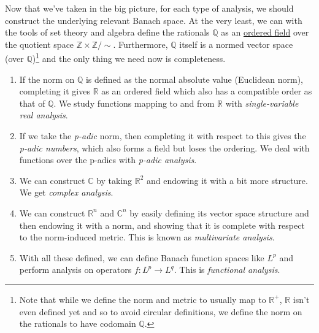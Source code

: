 Now that we've taken in the big picture, for each type of analysis, we should construct the underlying relevant Banach space. At the very least, we can with the tools of set theory and algebra define the rationals $\mathbb{Q}$ as an \hyperref[alg-def:ordered-field]{ordered field} over the quotient space $\mathbb{Z} \times \mathbb{Z} / \sim$. Furthermore, $\mathbb{Q}$ itself is a normed vector space (over $\mathbb{Q}$)\footnote{Note that while we define the norm and metric to usually map to $\mathbb{R}^+$, $\mathbb{R}$ isn't even defined yet and so to avoid circular definitions, we define the norm on the rationals to have codomain $\mathbb{Q}$. } and the only thing we need now is completeness. 
\begin{enumerate}
  \item If the norm on $\mathbb{Q}$ is defined as the normal absolute value (Euclidean norm), completing it gives $\mathbb{R}$ as an ordered field which also has a compatible order as that of $\mathbb{Q}$. We study functions mapping to and from $\mathbb{R}$ with \textit{single-variable real analysis}. 
  \item If we take the \textit{p-adic} norm, then completing it with respect to this gives the \textit{p-adic numbers}, which also forms a field but loses the ordering. We deal with functions over the p-adics with \textit{p-adic analysis}. 
  \item We can construct $\mathbb{C}$ by taking $\mathbb{R}^2$ and endowing it with a bit more structure. We get \textit{complex analysis}. 
  \item We can construct $\mathbb{R}^n$ and $\mathbb{C}^n$ by easily defining its vector space structure and then endowing it with a norm, and showing that it is complete with respect to the norm-induced metric. This is known as \textit{multivariate analysis}. 
  \item With all these defined, we can define Banach function spaces like $L^p$ and perform analysis on operators $f: L^p \rightarrow L^q$. This is \textit{functional analysis}. 
\end{enumerate}


